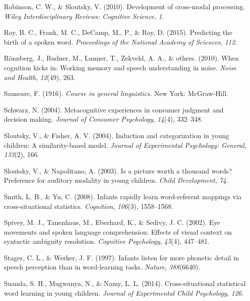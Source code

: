 \documentclass[english,,man,floatsintext]{apa6}
\theoremstyle{definition}
\theoremstyle{definition}
\theoremstyle{definition}
\theoremstyle{remark}
\begin{document}
\hypertarget{ref-robinson2010}{}
Robinson, C. W., \& Sloutsky, V. (2010). Development of cross-modal
processing. \emph{Wiley Interdisciplinary Reviews: Cognitive Science},
\emph{1}.

\hypertarget{ref-roy2015}{}
Roy, B. C., Frank, M. C., DeCamp, M., P., \& Roy, D. (2015). Predicting
the birth of a spoken word. \emph{Proceedings of the National Academy of
Sciences}, \emph{112}.

\hypertarget{ref-ronnberg2010}{}
Rönnberg, J., Rudner, M., Lunner, T., Zekveld, A. A., \& others. (2010).
When cognition kicks in: Working memory and speech understanding in
noise. \emph{Noise and Health}, \emph{12}(49), 263.

\hypertarget{ref-saussure1916}{}
Saussure, F. (1916). \emph{Course in general linguistics.} New York:
McGraw-Hill.

\hypertarget{ref-schwarz2004}{}
Schwarz, N. (2004). Metacognitive experiences in consumer judgment and
decision making. \emph{Journal of Consumer Psychology}, \emph{14}(4),
332--348.

\hypertarget{ref-sloutsky2004}{}
Sloutsky, V., \& Fisher, A. V. (2004). Induction and categorization in
young children: A similarity-based model. \emph{Journal of Experimental
Psychology: General}, \emph{133}(2), 166.

\hypertarget{ref-sloutsky2003}{}
Sloutsky, V., \& Napolitano, A. (2003). Is a picture worth a thousand
words? Preference for auditory modality in young children. \emph{Child
Development}, \emph{74}.

\hypertarget{ref-smith08}{}
Smith, L. B., \& Yu, C. (2008). Infants rapidly learn word-referent
mappings via cross-situational statistics. \emph{Cognition},
\emph{106}(3), 1558--1568.

\hypertarget{ref-spivey2002}{}
Spivey, M. J., Tanenhaus, M., Eberhard, K., \& Sedivy, J. C. (2002). Eye
movements and spoken language comprehension: Effects of visual context
on syntactic ambiguity resolution. \emph{Cognitive Psychology},
\emph{45}(4), 447--481.

\hypertarget{ref-stager1997}{}
Stager, C. L., \& Werker, J. F. (1997). Infants listen for more phonetic
detail in speech perception than in word-learning tasks. \emph{Nature},
\emph{388}(6640).

\hypertarget{ref-suanda2014}{}
Suanda, S. H., Mugwanya, N., \& Namy, L. L. (2014). Cross-situational
statistical word learning in young children. \emph{Journal of
Experimental Child Psychology}, \emph{126}.
\end{document}

